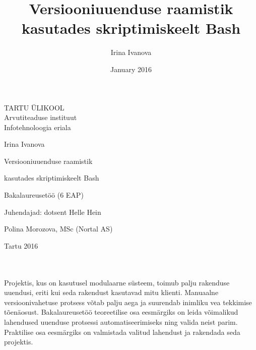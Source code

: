\documentclass[12pt]{report}
\title{Versiooniuuenduse raamistik kasutades skriptimiskeelt Bash}
\author{Irina Ivanova}
\date{January 2016}
\begin{document}
  \begin{titlepage}
    \begin{center}
      TARTU ÜLIKOOL\\
      Arvutiteaduse instituut\\
      Infotehnoloogia eriala
    \end{center}
      
    \vspace{5cm}
    
    \begin{center}  
      {\Large Irina Ivanova}
    \end{center}
    \begin{center}      
      {\huge Versiooniuuenduse raamistik}
    \end{center}
    \begin{center}
      {\huge kasutades skriptimiskeelt Bash}
    \end{center}
    \begin{center}
      {\large Bakalaureusetöö (6 EAP)}
    \end{center}
      
    \vspace{4cm}
    \hspace{4.5cm}
    Juhendajad: dotsent Helle Hein
    
    \hspace{7cm}
    Polina Morozova, MSc (Nortal AS)
      
    \vspace{2.5cm}
    \begin{center}
      Tartu 2016
    \end{center}
  \end{titlepage}

  \newpage
  
  \\
  
  \\
  Projektis, kus on kasutusel modulaarne süsteem, toimub palju rakenduse uuendusi, eriti kui seda rakendust kasutavad mitu klienti. Manuaalne versioonivahetuse protsess võtab palju aega ja suurendab inimliku vea tekkimise tõenäosust. Bakalaureusetöö teoreetilise osa eesmärgiks on leida võimalikud lahendused uuenduse protsessi automatiseerimiseks ning valida neist parim. Praktilise osa eesmärgiks on valmistada valitud lahendust ja rakendada seda projektis.\\
  
\end{document}
